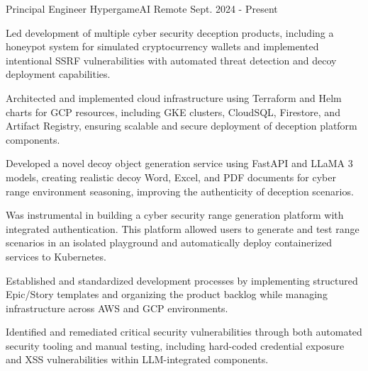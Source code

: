 
\begin{cventries}
\vspace{-3mm}
  \cventry
    {Principal Engineer} %
    {HypergameAI} %
    {Remote} %
    {Sept. 2024 - Present} %
    {
      \begin{cvitems}
        \item {
          Led development of multiple cyber security deception products, including a honeypot system for simulated cryptocurrency wallets and implemented intentional SSRF vulnerabilities with automated threat detection and decoy deployment capabilities.
        }
        \item {
          Architected and implemented cloud infrastructure using Terraform and Helm charts for GCP resources, including GKE clusters, CloudSQL, Firestore, and Artifact Registry, ensuring scalable and secure deployment of deception platform components.
        }
        \item {
          Developed a novel decoy object generation service using FastAPI and LLaMA 3 models, creating realistic decoy Word, Excel, and PDF documents for cyber range environment seasoning, improving the authenticity of deception scenarios.
        }
        \item {
          Was instrumental in building a cyber security range generation platform with integrated authentication. This platform allowed users to generate and test range scenarios in an isolated playground and automatically deploy containerized services to Kubernetes.
        }
        \item {
          Established and standardized development processes by implementing structured Epic/Story templates and organizing the product backlog while managing infrastructure across AWS and GCP environments.
        }
        \item {
          Identified and remediated critical security vulnerabilities through both automated security tooling and manual testing, including hard-coded credential exposure and XSS vulnerabilities within LLM-integrated components.
        }
      \end{cvitems}
    }


\end{cventries}
